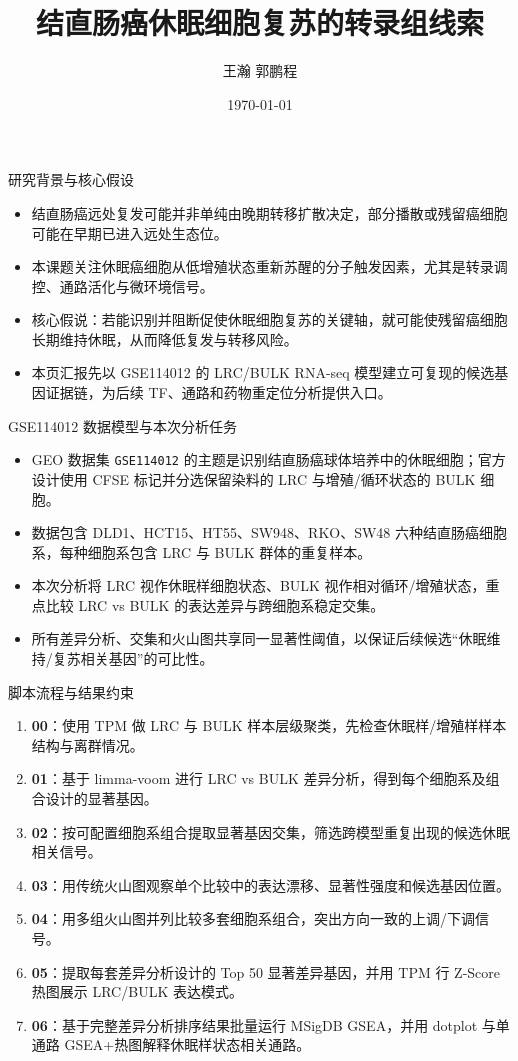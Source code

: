 \documentclass[11pt,aspectratio=169,xcolor=dvipsnames]{beamer}
\title[GSE114012 休眠细胞复苏]{结直肠癌休眠细胞复苏的转录组线索}
\subtitle{ }
\author{王瀚 郭鹏程}
\institute{ }
\date{\today}
\begin{document}
\begin{frame}
  \titlepage
\end{frame}

\begin{frame}{研究背景与核心假设}
  \begin{itemize}
    \item 结直肠癌远处复发可能并非单纯由晚期转移扩散决定，部分播散或残留癌细胞可能在早期已进入远处生态位。
    \item 本课题关注休眠癌细胞从低增殖状态重新苏醒的分子触发因素，尤其是转录调控、通路活化与微环境信号。
    \item 核心假说：若能识别并阻断促使休眠细胞复苏的关键轴，就可能使残留癌细胞长期维持休眠，从而降低复发与转移风险。
    \item 本页汇报先以 GSE114012 的 LRC/BULK RNA-seq 模型建立可复现的候选基因证据链，为后续 TF、通路和药物重定位分析提供入口。
  \end{itemize}
\end{frame}

\begin{frame}{GSE114012 数据模型与本次分析任务}
  \begin{itemize}
    \item GEO 数据集 \texttt{GSE114012} 的主题是识别结直肠癌球体培养中的休眠细胞；官方设计使用 CFSE 标记并分选保留染料的 LRC 与增殖/循环状态的 BULK 细胞。
    \item 数据包含 DLD1、HCT15、HT55、SW948、RKO、SW48 六种结直肠癌细胞系，每种细胞系包含 LRC 与 BULK 群体的重复样本。
    \item 本次分析将 LRC 视作休眠样细胞状态、BULK 视作相对循环/增殖状态，重点比较 LRC vs BULK 的表达差异与跨细胞系稳定交集。
    \item 所有差异分析、交集和火山图共享同一显著性阈值，以保证后续候选“休眠维持/复苏相关基因”的可比性。
  \end{itemize}
\end{frame}

\begin{frame}{脚本流程与结果约束}
  \begin{enumerate}
    \item \textbf{00}：使用 TPM 做 LRC 与 BULK 样本层级聚类，先检查休眠样/增殖样样本结构与离群情况。
    \item \textbf{01}：基于 limma-voom 进行 LRC vs BULK 差异分析，得到每个细胞系及组合设计的显著基因。
    \item \textbf{02}：按可配置细胞系组合提取显著基因交集，筛选跨模型重复出现的候选休眠相关信号。
    \item \textbf{03}：用传统火山图观察单个比较中的表达漂移、显著性强度和候选基因位置。
    \item \textbf{04}：用多组火山图并列比较多套细胞系组合，突出方向一致的上调/下调信号。
    \item \textbf{05}：提取每套差异分析设计的 Top 50 显著差异基因，并用 TPM 行 Z-Score 热图展示 LRC/BULK 表达模式。
    \item \textbf{06}：基于完整差异分析排序结果批量运行 MSigDB GSEA，并用 dotplot 与单通路 GSEA+热图解释休眠样状态相关通路。
  \end{enumerate}
\end{frame}
\end{document}

